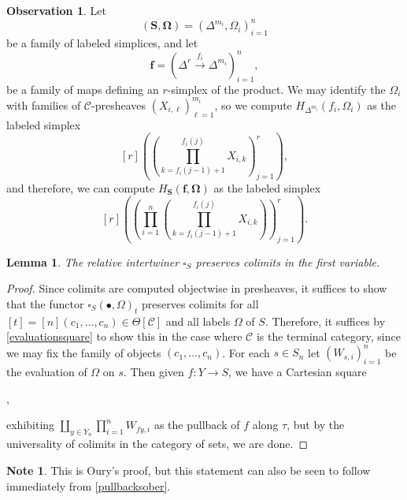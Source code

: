 \documentclass[a4paper]{article}
\numberwithin{equation}{subsection}
\theoremstyle{plain}   %
\newtheorem{lemma}[equation]{Lemma}
\theoremstyle{definition}
\newtheorem{note}[equation]{Note}
\newtheorem{obs}[equation]{Observation}
\theoremstyle{remark}
\theoremstyle{plain}
\providecommand{\C}{}
\renewcommand{\C}{\ensuremath{\mathcal{C}}}
\begin{document}
\begin{obs}
	Let \[(\mathbf{S},\mathbf{\Omega})=\left(\Delta^{m_i},\Omega_i\right)_{i=1}^n\] be a family of labeled simplices, and let \[\mathbf{f}=\left(\Delta^r\xrightarrow{f_i} \Delta^{m_i}\right)^n_{i=1},\] be a family of maps defining an \(r\)-simplex of the product.
	We may identify the \(\Omega_i\) with families of \(\C\)-presheaves \((X_{i,\ell})^{m_i}_{\ell=1}\), so we compute \(H_{\Delta^{m_i}}(f_i,\Omega_i)\) as the labeled simplex
	\[[r]\left(\left(\prod_{k=f_i(j-1)+1}^{f_i(j)} X_{i,k} \right)_{j=1}^r\right),\]
	and therefore, we can compute 
	\(H_{\mathbf{S}}(\mathbf{f},\mathbf{\Omega})\) as the labeled simplex
	\[ [r]\left(\left(\prod_{i=1}^n \left(\prod_{k=f_i(j-1)+1}^{f_i(j)} X_{i,k} \right)\right)_{j=1}^r\right).\]
\end{obs}
\begin{lemma}
	The relative intertwiner \(\square_S\) preserves colimits in the first variable.
\end{lemma}
\begin{proof} 
	Since colimits are computed objectwise in presheaves, it suffices to show that the functor \(\square_S(\bullet,\Omega)_t\) preserves colimits for all \([t]=[n](c_1,\dots,c_n) \in \Theta[\C]\) and all labels \(\Omega\) of \(S\).  Therefore, it suffices by \ref{evaluationsquare} to show this in the case where \(\C\) is the terminal category, since we may fix the family of objects \((c_1,\dots,c_n)\). For each \(s\in S_n\) let \((W_{s,i})_{i=1}^n\) be the evaluation of \(\Omega\) on \(s\).  Then given \(f:Y\to S\), we have a Cartesian square
	\begin{center}
		,
	\end{center}
	exhibiting \(\coprod_{y\in Y_n} \prod_{i=1}^n W_{fy,i}\) as the pullback of \(f\) along \(\tau\), but by the universality of colimits in the category of sets, we are done.  
\end{proof}

\begin{note} 
	This is Oury's proof, but this statement can also be seen to follow immediately from \ref{pullbacksober}.
\end{note}
\end{document}
